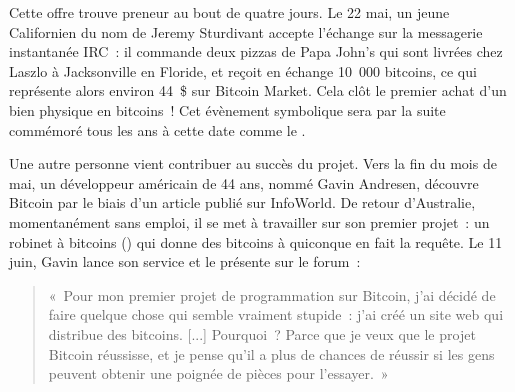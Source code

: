 Cette offre trouve preneur au bout de quatre jours. Le 22 mai, un jeune Californien du nom de Jeremy Sturdivant accepte l'échange sur la messagerie instantanée IRC~: il commande deux pizzas de Papa John's qui sont livrées chez Laszlo à Jacksonville en Floride, et reçoit en échange 10~000 bitcoins, ce qui représente alors environ 44~\$ sur Bitcoin Market. Cela clôt le premier achat d'un bien physique en bitcoins~! Cet évènement symbolique sera par la suite commémoré tous les ans à cette date comme le . %


Une autre personne vient contribuer au succès du projet. Vers la fin du mois de mai, un développeur américain de 44 ans, nommé Gavin Andresen, découvre Bitcoin par le biais d'un article publié sur InfoWorld. De retour d'Australie, momentanément sans emploi, il se met à travailler sur son premier projet~: un robinet à bitcoins () qui donne des bitcoins à quiconque en fait la requête. Le 11 juin, Gavin lance son service et le présente sur le forum~:

\begin{quote}
«~Pour mon premier projet de programmation sur Bitcoin, j'ai décidé de faire quelque chose qui semble vraiment stupide~: j'ai créé un site web qui distribue des bitcoins. [...] Pourquoi~? Parce que je veux que le projet Bitcoin réussisse, et je pense qu'il a plus de chances de réussir si les gens peuvent obtenir une poignée de pièces pour l'essayer.~»
\end{quote}

